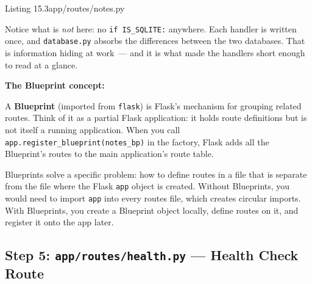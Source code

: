 \begin{codeboxcap}{\textcolor{accent}{Listing 15.3}\enspace app/routes/notes.py}
\begin{Shaded}
\begin{Highlighting}[]
\OperatorTok{=}
\OperatorTok{=}
    \OperatorTok{==} \NormalTok{:}
        \NormalTok{: }\SpecialCharTok{\{}\SpecialCharTok{\}}\NormalTok{\}), }
     \NormalTok{, }
\end{Highlighting}
\end{Shaded}

\end{codeboxcap}

\noindent{}Notice what is \emph{not} here: no \texttt{if\ IS\_SQLITE:} anywhere. Each handler is written once, and \texttt{database.py} absorbs the differences between the two databases. That is information hiding at work~--- and it is what made the handlers short enough to read at a glance.

\textbf{The Blueprint concept:}

A \textbf{Blueprint} (imported from \texttt{flask}) is Flask's mechanism for grouping related routes. Think of it as a partial Flask application: it holds route definitions but is not itself a running application. When you call \texttt{app.}\allowbreak{}\texttt{register\_}\allowbreak{}\texttt{blueprint(notes\_}\allowbreak{}\texttt{bp)} in the factory, Flask adds all the Blueprint's routes to the main application's route table.

Blueprints solve a specific problem: how to define routes in a file that is separate from the file where the Flask \texttt{app} object is created. Without Blueprints, you would need to import \texttt{app} into every routes file, which creates circular imports. With Blueprints, you create a Blueprint object locally, define routes on it, and register it onto the app later.

\subsection*{\texorpdfstring{Step 5:
\texttt{app/}\allowbreak{}\texttt{routes/}\allowbreak{}\texttt{health.py}
--- Health Check Route}{Step 5:  --- Health Check Route}}\label{15-structuring-the-application:step-5-approuteshealthpy--health-check-route}

